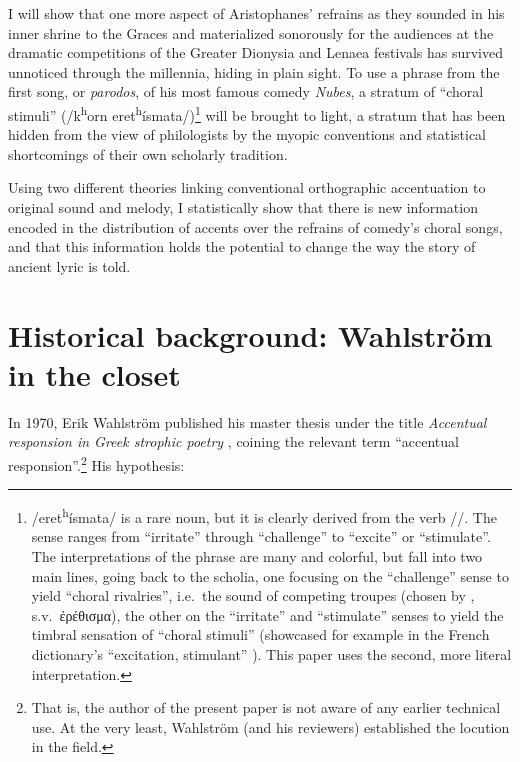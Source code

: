 \documentclass[twoside]{article}
\begin{document}
I will show that one more aspect of Aristophanes' refrains as they sounded in his inner shrine to the Graces and materialized sonorously for the audiences at the dramatic competitions of the Greater Dionysia and Lenaea festivals has survived unnoticed through the millennia, hiding in plain sight. To use a phrase from the first song, or \textit{parodos}, of his most famous comedy \textit{Nubes}, a stratum of ``choral stimuli'' (/k\textsuperscript{h}orn eret\textsuperscript{h}ísmata/)\footnote{/eret\textsuperscript{h}ísmata/ is a rare noun, but it is clearly derived from the verb //. The sense ranges from ``irritate'' through ``challenge'' to ``excite'' or ``stimulate''. The interpretations of the phrase are many and colorful, but fall into two main lines, going back to the scholia, one focusing on the ``challenge'' sense to yield ``choral rivalries'', i.e.\ the sound of competing troupes (chosen by \textcite{sluiter2024woordenboek}, s.v.\ \textgreek{ἐρέθισμα}), the other on the ``irritate'' and ``stimulate'' senses to yield the timbral sensation of ``choral stimuli'' (showcased for example in the French dictionary's ``excitation, stimulant'' \parencite{baillyDictionnaireGrecfrancais2000}). This paper uses the second, more literal interpretation.} will be brought to light, a stratum that has been hidden from the view of philologists by the myopic conventions and statistical shortcomings
of their own scholarly tradition. 

Using two different theories linking conventional orthographic accentuation to original sound and melody, I statistically show that there is new information encoded in the distribution of accents over the refrains of comedy's choral songs, and that this information holds the potential to change the way the story of ancient lyric is told.


\section{Historical background: Wahlström in the closet}\label{sec:hist1}

In 1970, Erik Wahlström published his master thesis under the title \textit{Accentual responsion in Greek strophic poetry} \parencite{wahlstromAccentualResponsionGreek1970}, coining the relevant term ``accentual responsion''.\footnote{That is, the author of the present paper is not aware of any earlier technical use. At the very least, Wahlström (and his reviewers) established the locution in the field.}
His hypothesis: 
\end{document}
